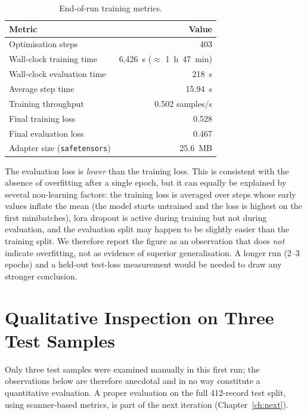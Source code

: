 \documentclass[12pt, a4paper]{report}
\begin{document}
\begin{table}[H]
  \centering
  \caption{End-of-run training metrics.}
  \label{tab:training-metrics}
  \small
  \begin{tabular}{lr}
    \toprule
    \textbf{Metric} & \textbf{Value} \\
    \midrule
    Optimisation steps                    & 403 \\
    Wall-clock training time              & 6{,}426~s ($\approx$ 1~h~47~min) \\
    Wall-clock evaluation time            & 218~s \\
    Average step time                     & 15.94~s \\
    Training throughput                   & 0.502 samples/s \\
    Final training loss                   & 0.528 \\
    Final evaluation loss                 & 0.467 \\
    Adapter size (\texttt{safetensors})   & 25.6~MB \\
    \bottomrule
  \end{tabular}
\end{table}

The evaluation loss is \emph{lower} than the training loss. This is
consistent with the absence of overfitting after a single epoch, but it
can equally be explained by several non-learning factors: the training
loss is averaged over steps whose early values inflate the mean (the
model starts untrained and the loss is highest on the first minibatches),
\gls{lora} dropout is active during training but not during evaluation,
and the evaluation split may happen to be slightly easier than the
training split. We therefore report the figure as an observation that
does \emph{not} indicate overfitting, not as evidence of superior
generalisation. A longer run (2--3 epochs) and a held-out test-loss
measurement would be needed to draw any stronger conclusion.

\section{Qualitative Inspection on Three Test Samples}

Only three test samples were examined manually in this first run; the
observations below are therefore anecdotal and in no way constitute a
quantitative evaluation. A proper evaluation on the full 412-record test
split, using scanner-based metrics, is part of the next iteration
(Chapter~\ref{ch:next}).
\end{document}
